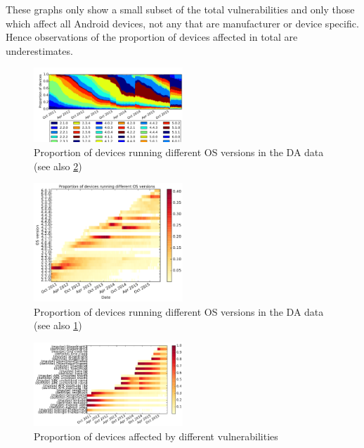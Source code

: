 \documentclass[a4paper,twocolumn]{article}
\begin{document}
These graphs only show a small subset of the total vulnerabilities and only those which affect all Android devices, not any that are manufacturer or device specific.
Hence observations of the proportion of devices affected in total are underestimates.
\begin{figure}
 \includegraphics[width=0.5\textwidth]{figures/da_norm_os.pdf}
 \caption{Proportion of devices running different OS versions in the DA data (see also \ref{fig:norm_os_heat})}
 \label{fig:da_norm_os}
\end{figure}
\begin{figure}
 \includegraphics[width=0.5\textwidth]{figures/norm_os_heat.pdf}
 \caption{Proportion of devices running different OS versions in the DA data (see also \ref{fig:da_norm_os})}
 \label{fig:norm_os_heat}
\end{figure}
\begin{figure}
 \includegraphics[width=0.5\textwidth]{figures/nvulnerabilities_heat.pdf}
 \caption{Proportion of devices affected by different vulnerabilities}
 \label{fig:nvulnerabilities_heat}
\end{figure}
\end{document}
